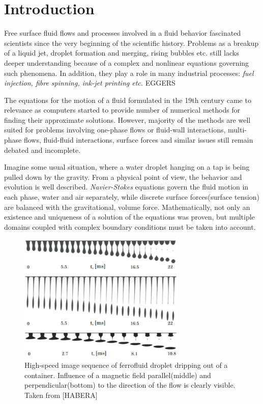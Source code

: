 \chapter*{Introduction}

\par Free surface fluid flows and processes involved in a fluid behavior fascinated scientists since the very beginning of the scientific history. Problems as a breakup of a liquid jet, droplet formation and merging, rising bubbles etc. still lacks deeper understanding because of a complex and nonlinear equations governing such phenomena. In addition, they play a role in many industrial processes: \textit{fuel injection, fibre spinning, ink-jet printing etc.} EGGERS

\par The equations for the motion of a fluid formulated in the 19th century came to relevance as computers started to provide number of numerical methods for finding their approximate solutions. However, majority of the methods are well suited for problems involving one-phase flows or fluid-wall interactions, multi-phase flows, fluid-fluid interactions, surface forces and similar issues still remain debated and incomplete.

\par Imagine some usual situation, where a water droplet hanging on a tap is being pulled down by the gravity. From a physical point of view, the behavior and evolution is well described. \textit{Navier-Stokes} equations govern the fluid motion in each phase, water and air separately, while discrete surface forces(surface tension) are balanced with the gravitational, volume force. Mathematically, not only an existence and uniqueness of a solution of the equations was proven, but multiple domains coupled with complex boundary conditions must be taken into account.


\begin{figure}[ht]
\centering
\includegraphics[width=80mm]{img/ferrofluid_motivation.png}
\caption{High-speed image sequence of ferrofluid droplet dripping out of a container. Influence of a magnetic field parallel(middle) and perpendicular(bottom) to the direction of the flow is clearly visible. Taken from [HABERA]}
\end{figure}

